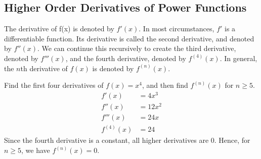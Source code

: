 \documentclass[handout]{ximera}
\begin{document}
\begin{center}
\begin{foldable}
\end{foldable}
\end{center}




\begin{center}
\begin{foldable}
\end{foldable}
\end{center}

\subsection{Higher Order Derivatives of Power Functions}

The derivative of f(x) is denoted by $f'(x)$. In most circumstances, $f'$ is a differentiable function. Its derivative is called
 the second derivative, and denoted by $f''(x)$. 
 We can continue this recursively to create the third derivative, denoted by $f'''(x)$, and the fourth derivative, 
 denoted by $f^{(4)}(x)$.  In general, the $n$th derivative of $f(x)$ is denoted by $f^{(n)}(x)$. 

 \begin{example}[example 9]
Find the first four derivatives of $f(x) = x^4$, and then find $f^{(n)}(x)$ for $n \geq 5$.\\
\begin{align*}
f'(x) &= 4x^3\\
f''(x) &= 12x^2\\
f'''(x) &= 24x\\
f^{(4)}(x) &= 24
\end{align*}  
Since the fourth derivative is a constant, all higher derivatives are 0.  
Hence, for $n \geq 5$, we have $f^{(n)}(x) = 0$.

\end{example}
\end{document}
